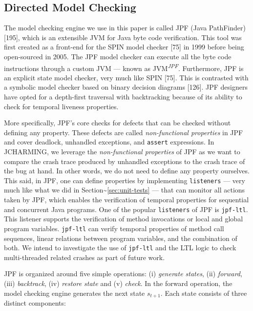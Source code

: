 \documentclass[12pt]{report}
\begin{document}
\subsection{Directed Model Checking}\label{directed-model-checking}

The model checking engine we use in this paper is called JPF (Java
PathFinder) {[}195{]}, which is an extensible JVM for Java byte code
verification. This tool was first created as a front-end for the SPIN
model checker {[}75{]} in 1999 before being open-sourced in 2005. The
JPF model checker can execute all the byte code instructions through a
custom JVM --- known as JVM\textsuperscript{\textit{JPF}}. Furthermore,
JPF is an explicit state model checker, very much like SPIN {[}75{]}.
This is contrasted with a symbolic model checker based on binary
decision diagrams {[}126{]}. JPF designers have opted for a depth-first
traversal with backtracking because of its ability to check for temporal
liveness properties.

More specifically, JPF's core checks for defects that can be checked
without defining any property. These defects are called
\textit{non-functional properties} in JPF and cover deadlock, unhandled
exceptions, and \texttt{assert} expressions. In JCHARMING, we leverage
the \textit{non-functional properties} of JPF as we want to compare the
crash trace produced by unhandled exceptions to the crash trace of the
bug at hand. In other words, we do not need to define any property
ourselves. This said, in JPF, one can define properties by implementing
\texttt{listeners} --- very much like what we did in
Section\textasciitilde{}\ref{sec:unit-tests} --- that can monitor all
actions taken by JPF, which enables the verification of temporal
properties for sequential and concurrent Java programs. One of the
popular \texttt{listeners} of JPF is \texttt{jpf-ltl}. This listener
supports the verification of method invocations or local and global
program variables. \texttt{jpf-ltl} can verify temporal properties of
method call sequences, linear relations between program variables, and
the combination of both. We intend to investigate the use of
\texttt{jpf-ltl} and the LTL logic to check multi-threaded related
crashes as part of future work.

JPF is organized around five simple operations: (i) \emph{generate
states}, (ii) \emph{forward}, (iii) \emph{backtrack}, (iv) \emph{restore
state} and (v) \emph{check}. In the forward operation, the model
checking engine generates the next state \(s_{t+1}\). Each state
consists of three distinct components:
\end{document}
